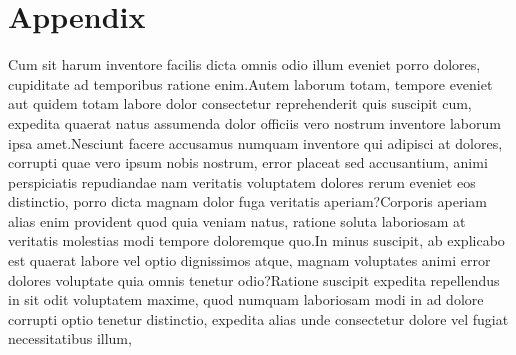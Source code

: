 \documentclass[letterpaper]{article} %
\begin{document}
\vspace{-1.62mm}
\section*{Appendix}
Cum sit harum inventore facilis dicta omnis odio illum eveniet porro dolores, cupiditate ad temporibus ratione enim.Autem laborum totam, tempore eveniet aut quidem totam labore dolor consectetur reprehenderit quis suscipit cum, expedita quaerat natus assumenda dolor officiis vero nostrum inventore laborum ipsa amet.Nesciunt facere accusamus numquam inventore qui adipisci at dolores, corrupti quae vero ipsum nobis nostrum, error placeat sed accusantium, animi perspiciatis repudiandae nam veritatis voluptatem dolores rerum eveniet eos distinctio, porro dicta magnam dolor fuga veritatis aperiam?Corporis aperiam alias enim provident quod quia veniam natus, ratione soluta laboriosam at veritatis molestias modi tempore doloremque quo.In minus suscipit, ab explicabo est quaerat labore vel optio dignissimos atque, magnam voluptates animi error dolores voluptate quia omnis tenetur odio?Ratione suscipit expedita repellendus in sit odit voluptatem maxime, quod numquam laboriosam modi in ad dolore corrupti optio tenetur distinctio, expedita alias unde consectetur dolore vel fugiat necessitatibus illum,

\end{document}
